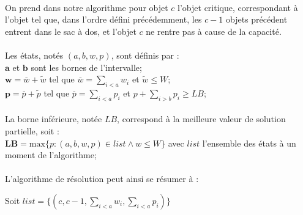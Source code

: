 \documentclass[12pt]{article}
\begin{document}
\paragraph{}On prend dans notre algorithme pour objet $c$ l'objet critique, correspondant à l'objet tel que, dans l'ordre défini précédemment, les $c-1$ objets précédent entrent dans le sac à dos, et l'objet $c$ ne rentre pas à cause de la capacité.

\paragraph{}Les états, notés $(a,b,w,p)$, sont définis par :\\
$\mathbf{a}$ et $\mathbf{b}$ sont les bornes de l'intervalle;\\
$\mathbf{w}=\overline{w}+\tilde{w}$ tel que $\overline{w}=\sum_{i<a}w_i$ et $\tilde{w} \leq W$;\\
$\mathbf{p}=\overline{p}+\tilde{p}$ tel que $\overline{p}=\sum_{i<a}p_i$ et $p+\sum_{i>b}p_i \geq LB$;\\

\paragraph{}La borne inférieure, notée $LB$, correspond à la meilleure valeur de solution partielle, soit :\\
$\mathbf{LB}=\mathrm{max}\lbrace p : (a,b,w,p) \in list \wedge w \leq W \rbrace$ avec $list$ l'ensemble des états à un moment de l'algorithme;

\paragraph{}L'algorithme de résolution peut ainsi se résumer à :\\
\begin{algorithm}[H]
	Soit $list=\lbrace (c,c-1,\sum_{i<a}w_i,\sum_{i<a}p_i)\rbrace $\\
\end{algorithm}
\end{document}
